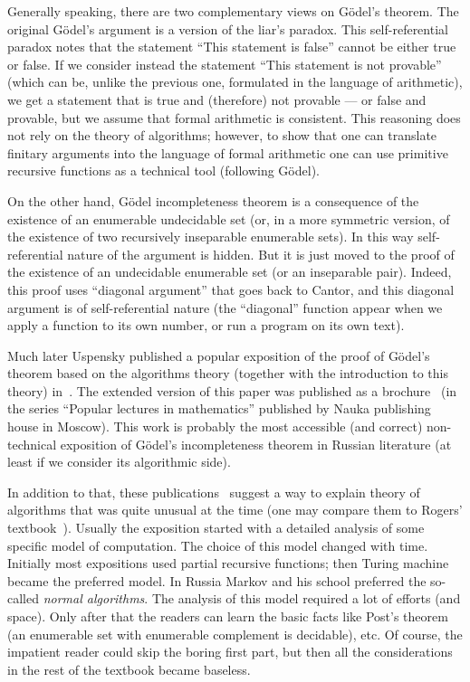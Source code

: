 \documentclass[12pt]{article}
\theoremstyle{remark}
\begin{document}
Generally speaking, there are two complementary views on G\"{o}del's theorem. The original G\"{o}del's argument is a version of the liar's paradox. This self-referential paradox notes that the statement ``This statement is false'' cannot be either true or false. If we consider instead the statement ``This statement is not provable'' (which can be, unlike the previous one, formulated in the language of arithmetic), we get a statement that is true and (therefore) not provable --- or false and provable, but we assume that formal arithmetic is consistent. This reasoning does not rely on the theory of algorithms; however, to show that one can translate finitary arguments into the language of formal arithmetic one can use primitive recursive functions as a technical tool (following G\"{o}del).

On the other hand, G\"{o}del incompleteness theorem is a consequence of the existence of an enumerable undecidable set (or, in a more symmetric version, of the existence of two recursively inseparable enumerable sets). In this way self-referential nature of the argument is hidden. But it is just moved to the proof of the existence of an undecidable enumerable set (or an inseparable pair). Indeed, this proof uses ``diagonal argument'' that goes back to Cantor, and this diagonal argument is of self-referential nature (the ``diagonal'' function appear when we apply a function to its own number, or run a program on its own text).

Much later Uspensky published a popular exposition of the proof of G\"{o}del's theorem based on the algorithms theory (together with the introduction to this theory) in~\cite{1974}. The extended version of this paper was published as a brochure~\cite{1982} (in the series ``Popular lectures in mathematics'' published by Nauka publishing house in Moscow). This work is probably the most accessible (and correct) non-technical exposition of G\"{o}del's incompleteness theorem in Russian literature (at least if we consider its algorithmic side).

In addition to that, these publications~\cite{1974,1982} suggest a way to explain theory of algorithms that was quite unusual at the time (one may compare them to Rogers' textbook~\cite{Rogers1972}). Usually the exposition started with a detailed analysis of some specific model of computation. The choice of this model changed with time. Initially most expositions used partial recursive functions; then Turing machine became the preferred model. In Russia Markov and his school preferred the so-called \emph{normal algorithms}. The analysis of this model required a lot of efforts (and space). Only after that the readers can learn the basic facts like Post's theorem (an enumerable set with enumerable complement is decidable), etc. Of course, the impatient reader could skip the boring first part, but then all the considerations in the rest of the textbook became baseless.
\end{document}

